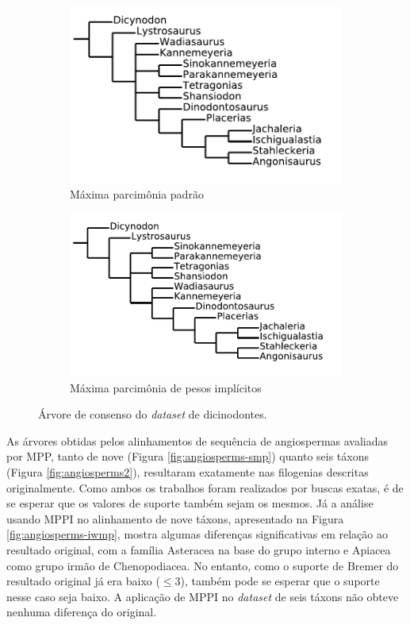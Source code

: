 \documentclass[12pt]{article}
\begin{document}
\begin{figure}[ht]
  \centering
  \begin{subfigure}{.4\textwidth}
    \includegraphics[width=\textwidth]{img/dicynodons-smp_svg-tex.pdf}
    \caption{Máxima parcimônia padrão}
    \label{fig:dicynodons-smp}
  \end{subfigure}
  \begin{subfigure}{.4\textwidth}
    \includegraphics[width=\textwidth]{img/dicynodons-iwmp_svg-tex.pdf}
    \caption{Máxima parcimônia de pesos implícitos}
    \label{fig:dicynodons-iwmp}
  \end{subfigure}
  \caption{Árvore de consenso do \emph{dataset} de dicinodontes.}
  \label{fig:dicynodons}
\end{figure}

As árvores obtidas pelos alinhamentos de sequência de angiospermas avaliadas por MPP, tanto de nove (Figura \ref{fig:angiosperms-smp}) quanto seis táxons (Figura \ref{fig:angiosperms2}), resultaram exatamente nas filogenias descritas originalmente. Como ambos os trabalhos foram realizados por buscas exatas, é de se esperar que os valores de suporte também sejam os mesmos. Já a análise usando MPPI no alinhamento de nove táxons, apresentado na Figura \ref{fig:angiosperms-iwmp}, mostra algumas diferenças significativas em relação ao resultado original, com a família Asteracea na base do grupo interno e Apiacea como grupo irmão de Chenopodiacea. No entanto, como o suporte de Bremer do resultado original já era baixo ($\leq 3$), também pode se esperar que o suporte nesse caso seja baixo. A aplicação de MPPI no \emph{dataset} de seis táxons não obteve nenhuma diferença do original.
\end{document}
